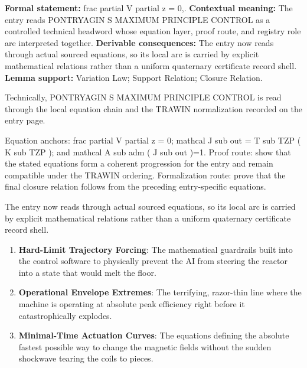 \begingroup\footnotesize\setlength{\emergencystretch}{3em}\sloppy
\textbf{Formal statement:} frac partial V partial z = 0,. \textbf{Contextual meaning:} The entry reads PONTRYAGIN S MAXIMUM PRINCIPLE CONTROL as a controlled technical headword whose equation layer, proof route, and registry role are interpreted together. \textbf{Derivable consequences:} The entry now reads through actual sourced equations, so its local arc is carried by explicit mathematical relations rather than a uniform quaternary certificate record shell. \textbf{Lemma support:} Variation Law; Support Relation; Closure Relation.\par
\endgroup

Technically, PONTRYAGIN S MAXIMUM PRINCIPLE CONTROL is read through the local equation chain and the TRAWIN normalization recorded on the entry page.

Equation anchors: frac partial V partial z = 0; mathcal J sub out = T sub TZP ( K sub TZP ); and mathcal A sub adm ( J sub out )=1. Proof route: show that the stated equations form a coherent progression for the entry and remain compatible under the TRAWIN ordering. Formalization route: prove that the final closure relation follows from the preceding entry-specific equations.

The entry now reads through actual sourced equations, so its local arc is carried by explicit mathematical relations rather than a uniform quaternary certificate record shell.
\endgroup

\begin{enumerate}[leftmargin=1.6em,itemsep=6pt,topsep=4pt]
\item \textbf{Hard-Limit Trajectory Forcing}: The mathematical guardrails built into the control software to physically prevent the AI from steering the reactor into a state that would melt the floor.
\item \textbf{Operational Envelope Extremes}: The terrifying, razor-thin line where the machine is operating at absolute peak efficiency right before it catastrophically explodes.
\item \textbf{Minimal-Time Actuation Curves}: The equations defining the absolute fastest possible way to change the magnetic fields without the sudden shockwave tearing the coils to pieces.
\end{enumerate}


